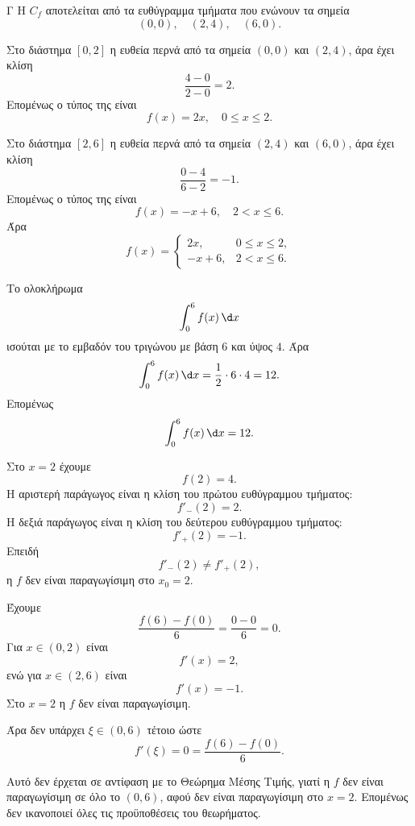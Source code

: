 \begin{thema}{Γ}
Η $C_f$ αποτελείται από τα ευθύγραμμα τμήματα που ενώνουν τα σημεία
\[
(0,0),\quad (2,4),\quad (6,0).
\]
\begin{erwthma}
\item Στο διάστημα $[0,2]$ η ευθεία περνά από τα σημεία $(0,0)$ και $(2,4)$, άρα έχει κλίση
\[
\frac{4-0}{2-0}=2.
\]
Επομένως ο τύπος της είναι
\[
f(x)=2x,\quad 0\leq x\leq2.
\]

Στο διάστημα $[2,6]$ η ευθεία περνά από τα σημεία $(2,4)$ και $(6,0)$, άρα έχει κλίση
\[
\frac{0-4}{6-2}=-1.
\]
Επομένως ο τύπος της είναι
\[
f(x)=-x+6,\quad 2<x\leq6.
\]
Άρα
\[
{
f(x)=
\begin{cases}
2x, & 0\leq x\leq2,\\
-x+6, & 2<x\leq6.
\end{cases}}
\]

\item Το ολοκλήρωμα
\[
\dint_0^6 f(x)\,\d x
\]
ισούται με το εμβαδόν του τριγώνου με βάση $6$ και ύψος $4$.
Άρα
\[
\dint_0^6 f(x)\,\d x
=\frac12\cdot6\cdot4=12.
\]
Επομένως
\[
{\dint_0^6 f(x)\,\d x=12}.
\]

\item Στο $x=2$ έχουμε
\[
f(2)=4.
\]
Η αριστερή παράγωγος είναι η κλίση του πρώτου ευθύγραμμου τμήματος:
\[
f'_-(2)=2.
\]
Η δεξιά παράγωγος είναι η κλίση του δεύτερου ευθύγραμμου τμήματος:
\[
f'_+(2)=-1.
\]
Επειδή
\[
f'_-(2)\neq f'_+(2),
\]
η $f$ δεν είναι παραγωγίσιμη στο $x_0=2$.

\item Έχουμε
\[
\frac{f(6)-f(0)}{6}
=\frac{0-0}{6}=0.
\]
Για $x\in(0,2)$ είναι
\[
f'(x)=2,
\]
ενώ για $x\in(2,6)$ είναι
\[
f'(x)=-1.
\]
Στο $x=2$ η $f$ δεν είναι παραγωγίσιμη.

Άρα δεν υπάρχει $\xi\in(0,6)$ τέτοιο ώστε
\[
f'(\xi)=0=\frac{f(6)-f(0)}{6}.
\]

Αυτό δεν έρχεται σε αντίφαση με το Θεώρημα Μέσης Τιμής, γιατί η $f$ δεν είναι παραγωγίσιμη σε όλο το $(0,6)$, αφού δεν είναι παραγωγίσιμη στο $x=2$. Επομένως δεν ικανοποιεί όλες τις προϋποθέσεις του θεωρήματος.
\end{erwthma}
\end{thema}

